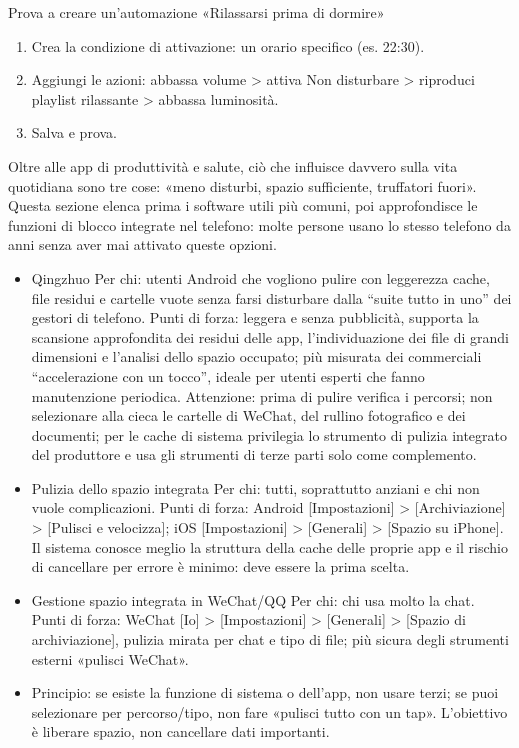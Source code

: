 \begin{tcbpractice}{Prova a creare un'automazione «Rilassarsi prima di dormire»}
\begin{enumerate}
  \item Crea la condizione di attivazione: un orario specifico (es. 22:30).
  \item Aggiungi le azioni: abbassa volume > attiva Non disturbare > riproduci playlist rilassante > abbassa luminosità.
  \item Salva e prova.
\end{enumerate}

\end{tcbpractice}


Oltre alle app di produttività e salute, ciò che influisce davvero sulla vita quotidiana sono tre cose: «meno disturbi, spazio sufficiente, truffatori fuori». Questa sezione elenca prima i software utili più comuni, poi approfondisce le funzioni di blocco integrate nel telefono: molte persone usano lo stesso telefono da anni senza aver mai attivato queste opzioni.


\begin{itemize}
  \item Qingzhuo Per chi: utenti Android che vogliono pulire con leggerezza cache, file residui e cartelle vuote senza farsi disturbare dalla “suite tutto in uno” dei gestori di telefono. Punti di forza: leggera e senza pubblicità, supporta la scansione approfondita dei residui delle app, l'individuazione dei file di grandi dimensioni e l'analisi dello spazio occupato; più misurata dei commerciali “accelerazione con un tocco”, ideale per utenti esperti che fanno manutenzione periodica. Attenzione: prima di pulire verifica i percorsi; non selezionare alla cieca le cartelle di WeChat, del rullino fotografico e dei documenti; per le cache di sistema privilegia lo strumento di pulizia integrato del produttore e usa gli strumenti di terze parti solo come complemento.
  \item Pulizia dello spazio integrata Per chi: tutti, soprattutto anziani e chi non vuole complicazioni. Punti di forza: Android [Impostazioni] > [Archiviazione] > [Pulisci e velocizza]; iOS [Impostazioni] > [Generali] > [Spazio su iPhone]. Il sistema conosce meglio la struttura della cache delle proprie app e il rischio di cancellare per errore è minimo: deve essere la prima scelta.
  \item Gestione spazio integrata in WeChat/QQ Per chi: chi usa molto la chat. Punti di forza: WeChat [Io] > [Impostazioni] > [Generali] > [Spazio di archiviazione], pulizia mirata per chat e tipo di file; più sicura degli strumenti esterni «pulisci WeChat».
  \item Principio: se esiste la funzione di sistema o dell'app, non usare terzi; se puoi selezionare per percorso/tipo, non fare «pulisci tutto con un tap». L'obiettivo è liberare spazio, non cancellare dati importanti.
\end{itemize}

